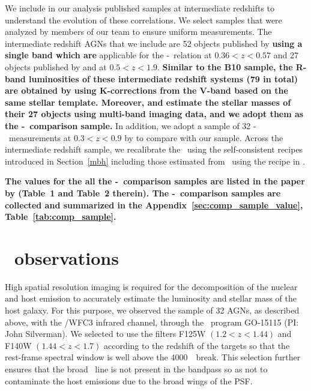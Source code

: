\documentclass[apj]{emulateapj}
\begin{document}
We include in our analysis published samples at intermediate redshifts to understand the evolution of these correlations. We select samples that were analyzed by members of our team to ensure uniform measurements. The intermediate redshift AGNs that we include are 52 objects published by \citet{Park15} {\bf using a single band which are} applicable for the \mbh-\lhost\ relation at $0.36<z<0.57$ and 27 objects published by \citet{Bennert11} and \citet{SS13} at $0.5<z<1.9$. {\bf Similar to the B10 sample, the R-band luminosities of these intermediate redshift systems (79 in total) are obtained by \citet{Ding2017b} using K-corrections from the V-band based on the same stellar template. Moreover, \citet{Bennert11} and \citet{SS13} estimate the stellar masses of their 27 objects using multi-band imaging data, and we adopt them as the \mbh-\smass\ comparison sample.}
 In addition, we adopt a sample of 32 \mbh-\smass\ measurements at $0.3<z<0.9$ by \citet{Cisternas2011} to compare with our sample. Across the intermediate redshift sample, we recalibrate the \mbh\ using the self-consistent recipes introduced in Section~\ref{mbh} including those estimated from \Mgii\ using the recipe in \citet{Ding2017b}. 

{\bf The values for the all the \mbh-\lhost\ comparison samples are listed in the paper by \citet{Ding2017b} (Table~1 and Table~2 therein). The \mbh-\smass\ comparison samples are collected and summarized in the Appendix~\ref{sec:comp_sample_value}, Table~\ref{tab:comp_sample}.}

\section{\hst\ observations}
\label{observation}
High spatial resolution imaging is required for the decomposition of the nuclear and host emission to accurately estimate the luminosity and stellar mass of the host galaxy. For this purpose, we observed the sample of 32 AGNs, as described above, with the \hst/WFC3 infrared channel, through the \hst\ program GO-15115 (PI: John Silverman). We selected to use the filters F125W $(1.2<z<1.44)$ and F140W $(1.44<z<1.7)$ according to the redshift of the targets so that the rest-frame spectral window is well above the 4000~\angstrom\ break. This selection further ensures that the broad \halpha\ line is not present in the bandpass so as not to contaminate the host emissions due to the broad wings of the PSF.
\end{document}
